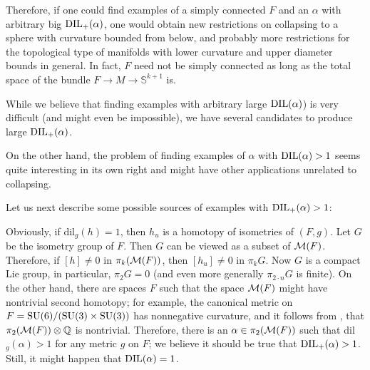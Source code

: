 \documentclass{amsart}
\begin{document}
Therefore, if one could find examples of a simply connected $F$ and an $\alpha$ with arbitrary big $\operatorname{\rm DIL}_+(\alpha)$, one would obtain new restrictions on collapsing to a sphere with curvature bounded from below, and probably more restrictions for the topological type of manifolds with lower curvature and upper diameter bounds in general.
In fact, $F$ need not be simply connected as long as the total space of the bundle $F\to M\to \mathbb{S}^{k+1}$ is.

While we believe that finding examples with arbitrary large  $\operatorname{\rm DIL}(\alpha)$) is very difficult
(and might even be impossible), we have several candidates to produce large $\operatorname{\rm DIL}_+(\alpha)$.

On the other hand, the problem of finding examples of $\alpha$ with
$\operatorname{\rm DIL}(\alpha)>1$
seems quite interesting in its own right and might have other applications unrelated to collapsing.

\medskip

Let us next describe  some possible sources of  examples with
$\operatorname{\rm DIL}_+(\alpha)>1$:

\begin{ex}
Obviously, if dil$_g(h)=1$, then $h_u$ is a homotopy of isometries of $(F,g)$.
Let $G$ be the isometry group of $F$.
Then $G$ can be viewed as a subset of ${\mathcal M}(F)$.
Therefore, if $[h]\not= 0$ in $\pi_k({\mathcal M}(F))$, then $[h_u]\not=0$ in $\pi_kG$.
Now $G$ is a compact Lie group, in particular, $\pi_2G=0$
(and even more generally $\pi_{2{\cdot} n}G$ is finite).
On the other hand, there are spaces $F$ such that the space ${\mathcal M}(F)$ might have nontrivial second homotopy;
for example, the canonical metric on $F\z=\mathrm{SU}(6)/(\mathrm{SU}(3)\z\times \mathrm{SU}(3))$ has nonnegative curvature,
and it follows
from  \cite[Chapter 5, Example 4.14]{OT},
that
$\pi_2({\mathcal M}(F))\otimes \mathbb{Q}$ is nontrivial.
Therefore, there is  an $\alpha \in \pi_2({\mathcal M}(F))$ such that
dil$_g(\alpha)>1$ for any metric $g $ on $F$;
we believe it should be true that $\operatorname{\rm DIL}_+(\alpha)>1$.
Still, it might happen that $\operatorname{\rm DIL}(\alpha)=1$.
\end{ex}
\end{document}

